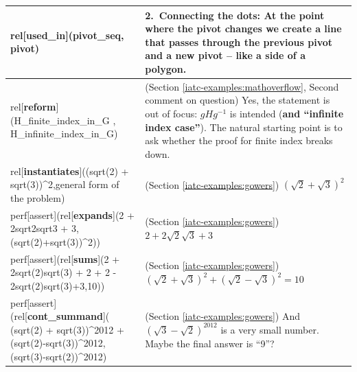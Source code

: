 \documentclass[smallextended,oneside]{svjour3}       %
\begin{document}
\noindent
\noindent\begin{tabular}{|p{}|p{}|}
\hline
rel[\textbf{used_in}](pivot_seq, pivot) & 2.~Connecting the dots: At the point where the pivot changes we create a line that passes through the previous \textbf{pivot} and a new \textbf{pivot} -- like a side of a polygon.\\ \hline
rel[\textbf{reform}](H_finite_index_in_G , H_infinite_index_in_G) & (Section \ref{iatc-examples:mathoverflow}, Second comment on question) Yes, the statement is out of focus: $gHg^{-1}$ is intended (\textbf{and ``infinite index case''}). The natural starting point is to ask whether the proof for finite index breaks down. \\ \hline
rel[\textbf{instantiates}]((sqrt(2) + sqrt(3))\textasciicircum2,general form of the problem) & (Section \ref{iatc-examples:gowers}) $(\sqrt{2}+\sqrt{3})^2$ \\ \hline
perf[assert](rel[\textbf{expands}](2 + 2sqrt{2}sqrt{3} + 3, (sqrt(2)+sqrt(3))\textasciicircum2)) & (Section \ref{iatc-examples:gowers}) $2+2\sqrt{2}\sqrt{3}+3$\\ \hline
perf[assert](rel[\textbf{sums}](2 + 2sqrt(2)sqrt(3) + 2 + 2 - 2sqrt(2)sqrt(3)+3,10)) & (Section \ref{iatc-examples:gowers}) $(\sqrt{2}+\sqrt{3})^2 + (\sqrt{2}-\sqrt{3})^2 = 10$ \\ \hline
perf[assert](rel[\textbf{cont_summand}]( (sqrt(2) + sqrt(3))\textasciicircum2012 + (sqrt(2)-sqrt(3))\textasciicircum2012,(sqrt(3)-sqrt(2))\textasciicircum2012) & (Section \ref{iatc-examples:gowers}) And $(\sqrt{3}-\sqrt{2})^{2012}$ is a very small number.
Maybe the final answer is ``9''? \\ \hline
\end{tabular}


%
\end{document}
